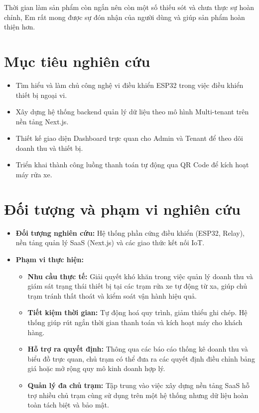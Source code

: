 \documentclass[../main.tex]{subfiles}
\begin{document}
Thời gian làm sản phẩm còn ngắn nên còn một số thiếu sót và chưa thực sự hoàn chỉnh, Em rất mong được sự đón nhận của người dùng và giúp sản phẩm hoàn thiện hơn.

\section*{Mục tiêu nghiên cứu}
\begin{itemize}
    \item Tìm hiểu và làm chủ công nghệ vi điều khiển ESP32 trong việc điều khiển thiết bị ngoại vi.
    \item Xây dựng hệ thống backend quản lý dữ liệu theo mô hình Multi-tenant trên nền tảng Next.js.
    \item Thiết kế giao diện Dashboard trực quan cho Admin và Tenant để theo dõi doanh thu và thiết bị.
    \item Triển khai thành công luồng thanh toán tự động qua QR Code để kích hoạt máy rửa xe.
\end{itemize}

\section*{Đối tượng và phạm vi nghiên cứu}
\begin{itemize}
    \item \textbf{Đối tượng nghiên cứu:} Hệ thống phần cứng điều khiển (ESP32, Relay), nền tảng quản lý SaaS (Next.js) và các giao thức kết nối IoT.
    \item \textbf{Phạm vi thực hiện:}
    \begin{itemize}
        \item \textbf{Nhu cầu thực tế:} Giải quyết khó khăn trong việc quản lý doanh thu và giám sát trạng thái thiết bị tại các trạm rửa xe tự động từ xa, giúp chủ trạm tránh thất thoát và kiểm soát vận hành hiệu quả.
        \item \textbf{Tiết kiệm thời gian:} Tự động hoá quy trình, giảm thiểu ghi chép. Hệ thống giúp rút ngắn thời gian thanh toán và kích hoạt máy cho khách hàng.
        \item \textbf{Hỗ trợ ra quyết định:} Thông qua các báo cáo thống kê doanh thu và biểu đồ trực quan, chủ trạm có thể đưa ra các quyết định điều chỉnh bảng giá hoặc mở rộng quy mô kinh doanh hợp lý.
        \item \textbf{Quản lý đa chủ trạm:} Tập trung vào việc xây dựng nền tảng SaaS hỗ trợ nhiều chủ trạm cùng sử dụng trên một hệ thống nhưng dữ liệu hoàn toàn tách biệt và bảo mật.
    \end{itemize}
\end{itemize}
\end{document}

